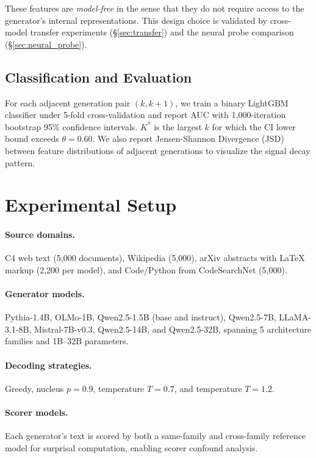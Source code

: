 \documentclass[11pt,a4paper]{article}
\begin{document}
These features are \emph{model-free} in the sense that they do not require access to the generator's internal representations. This design choice is validated by cross-model transfer experiments (\S\ref{sec:transfer}) and the neural probe comparison (\S\ref{sec:neural_probe}).

\subsection{Classification and Evaluation}

For each adjacent generation pair $(k, k\!+\!1)$, we train a binary LightGBM classifier under 5-fold cross-validation and report AUC with 1,000-iteration bootstrap 95\% confidence intervals. $K^*$ is the largest $k$ for which the CI lower bound exceeds $\theta = 0.60$. We also report Jensen-Shannon Divergence (JSD) between feature distributions of adjacent generations to visualize the signal decay pattern.

\section{Experimental Setup}

\paragraph{Source domains.} C4 web text (5,000 documents), Wikipedia (5,000), arXiv abstracts with LaTeX markup (2,200 per model), and Code/Python from CodeSearchNet (5,000).

\paragraph{Generator models.} Pythia-1.4B, OLMo-1B, Qwen2.5-1.5B (base and instruct), Qwen2.5-7B, LLaMA-3.1-8B, Mistral-7B-v0.3, Qwen2.5-14B, and Qwen2.5-32B, spanning 5 architecture families and 1B--32B parameters.

\paragraph{Decoding strategies.} Greedy, nucleus $p\!=\!0.9$, temperature $T\!=\!0.7$, and temperature $T\!=\!1.2$.

\paragraph{Scorer models.} Each generator's text is scored by both a same-family and cross-family reference model for surprisal computation, enabling scorer confound analysis.
\end{document}
